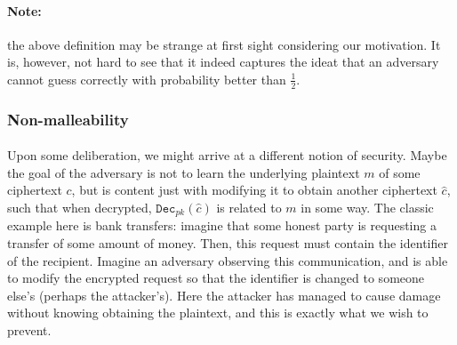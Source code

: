 \documentclass{article}
\theoremstyle{definition}
\newcommand{\Dec}{\texttt{Dec}}
\begin{document}
\paragraph{Note:} the above definition may be strange at first sight considering
our motivation. It is, however, not hard to see that it indeed captures the
ideat that an adversary cannot guess correctly with probability better than
$\frac12$. 
\subsubsection{Non-malleability}
\paragraph{} Upon some deliberation, we might arrive at a different notion of
security. Maybe the goal of the adversary is not to learn the underlying
plaintext $m$ of some ciphertext $c$, but is content just with modifying it to
obtain another ciphertext $\hat{c}$, such that when decrypted,
$\Dec_{pk}(\hat{c})$ is related to $m$ in some way. The classic example here is
bank transfers: imagine that some honest party is requesting a transfer of some
amount of money. Then, this request must contain the identifier of the
recipient. Imagine an adversary observing this communication, and is able to
modify the encrypted request so that the identifier is changed to someone else's
(perhaps the attacker's). Here the attacker has managed to cause damage without
knowing obtaining the plaintext, and this is exactly what we wish to prevent.
\end{document}
